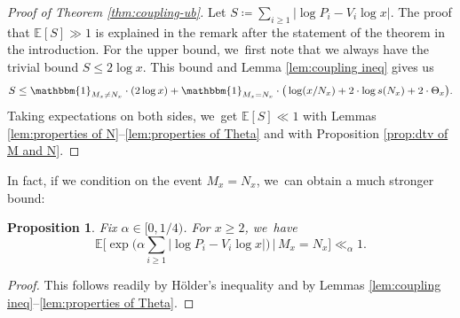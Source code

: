 \documentclass[10pt]{amsart}
\newcommand{\EE}{\mathbb{E}}
\newcommand{\one}{\mathbbm{1}}
\newcommand{\bg}{\big}
\newcommand{\bgg}{\Big}
\theoremstyle{plain}
\newtheorem{prop}[cor]{Proposition}
\theoremstyle{definition}
\begin{document}
\begin{proof}[Proof of Theorem \ref{thm:coupling-ub}]
Let $S \coloneqq \sum_{i \ge 1} |{\log P_i - V_i\log x}|$. The proof that $\EE[S] \gg 1$ is explained in the remark after the statement of the theorem in the introduction. For the upper bound, we~first note that we always have the trivial bound $S \le 2 \log x$. This bound and Lemma \ref{lem:coupling ineq} gives us
\[
S \le \one_{M_x \ne N_x}\cdot (2\log x) + \one_{M_x = N_x}\cdot \bg(\log(x/N_x) + 2\cdot \log s(N_x) + 2\cdot \Theta_x\bg).
\]
Taking expectations on both sides, we~get $\EE[S] \ll 1$ with Lemmas \ref{lem:properties of N}--\ref{lem:properties of Theta} and with Proposition \ref{prop:dtv of M and N}.
\end{proof}

In fact, if we condition on the event $M_x = N_x$, we~can obtain a much stronger bound:

\begin{prop}\label{thm:coupling-ub strong}
Fix $\alpha\in[0,1/4)$. For $x\ge2$, we~have
\[\textstyle
\EE\bgg[\exp\bg(\alpha \sum_{i \ge 1} |\log P_i - V_i \log x|\bg) \,\bg|\, M_x = N_x \bgg] \ll_{\alpha} 1.
\]
\end{prop}

\begin{proof}
This follows readily by Hölder's inequality and by Lemmas \ref{lem:coupling ineq}--\ref{lem:properties of Theta}.
\end{proof}

\label{sec:coupling:remarks}
\end{document}
